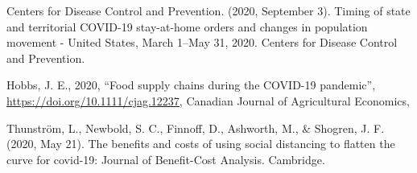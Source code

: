 \documentclass[
  11 pt,
]{article}
\newenvironment{Shaded}{\begin{snugshade}}{\end{snugshade}}
\newcommand{\AttributeTok}[1]{\textcolor[rgb]{0.77,0.63,0.00}{#1}}
\newcommand{\CommentTok}[1]{\textcolor[rgb]{0.56,0.35,0.01}{\textit{#1}}}
\newcommand{\ConstantTok}[1]{\textcolor[rgb]{0.00,0.00,0.00}{#1}}
\newcommand{\DecValTok}[1]{\textcolor[rgb]{0.00,0.00,0.81}{#1}}
\newcommand{\FunctionTok}[1]{\textcolor[rgb]{0.00,0.00,0.00}{#1}}
\newcommand{\NormalTok}[1]{#1}
\newcommand{\OtherTok}[1]{\textcolor[rgb]{0.56,0.35,0.01}{#1}}
\newcommand{\SpecialCharTok}[1]{\textcolor[rgb]{0.00,0.00,0.00}{#1}}
\newcommand{\StringTok}[1]{\textcolor[rgb]{0.31,0.60,0.02}{#1}}
\begin{document}
Centers for Disease Control and Prevention. (2020, September 3). Timing
of state and territorial COVID-19 stay-at-home orders and changes in
population movement - United States, March 1--May 31, 2020. Centers for
Disease Control and Prevention.

Hobbs, J. E., 2020, ``Food supply chains during the COVID-19 pandemic'',
\url{https://doi.org/10.1111/cjag.12237}, Canadian Journal of
Agricultural Economics,

Thunström, L., Newbold, S. C., Finnoff, D., Ashworth, M., \& Shogren, J.
F. (2020, May 21). The benefits and costs of using social distancing to
flatten the curve for covid-19: Journal of Benefit-Cost Analysis.
Cambridge.

\begin{Shaded}
\end{Shaded}
\end{document}

